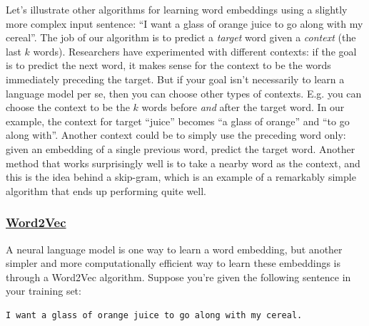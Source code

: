 \documentclass[12pt]{article}
\begin{document}
Let's illustrate other algorithms for learning word embeddings using a slightly more complex input sentence: ``I want a glass of orange juice to go along with my cereal''. The job of our algorithm is to predict a \emph{target} word given a \emph{context} (the last $k$ words). Researchers have experimented with different contexts: if the goal is to predict the next word, it makes sense for the context to be the words immediately preceding the target. But if your goal isn't necessarily to learn a language model per se, then you can choose other types of contexts. E.g. you can choose the context to be the $k$ words before \emph{and} after the target word. In our example, the context for target ``juice'' becomes ``a glass of orange'' and ``to go along with''. Another context could be to simply use the preceding word only: given an embedding of a single previous word, predict the target word. Another method that works surprisingly well is to take a nearby word as the context, and this is the idea behind a skip-gram, which is an example of a remarkably simple algorithm that ends up performing quite well.

\subsubsection{\href{https://arxiv.org/abs/1301.3781}{Word2Vec}}
A neural language model is one way to learn a word embedding, but another simpler and more computationally efficient way to learn these embeddings is through a Word2Vec algorithm. Suppose you're given the following sentence in your training set:

\begin{verbatim}
I want a glass of orange juice to go along with my cereal.
\end{verbatim}
\label{snt: sentencesequenceorangejuice}
\end{document}
